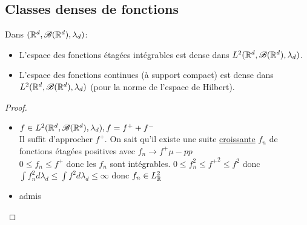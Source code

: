 \subsection{Classes denses de fonctions}

\begin{theorem}
	Dans $(\mathbb{R}^d, \mathscr{B} (\mathbb{R}^d), \lambda_d)$:

	\begin{itemize}
		\item L'espace des fonctions étagées intégrables est dense dans $L^2(\mathbb{R}^d, \mathscr{B} (\mathbb{R}^d), \lambda_d)$.
		\item L'espace des fonctions continues (à support compact) est dense dans $L^2(\mathbb{R}^d, \mathscr{B} (\mathbb{R}^d), \lambda_d)$ (pour la norme de l'espace de Hilbert).
	\end{itemize}
\end{theorem}

\begin{proof}
	\begin{itemize}
		\item $ f \in L^2(\mathbb{R}^d, \mathscr{B} (\mathbb{R}^d), \lambda_d), f = f^+ + f^-$\\
		      Il suffit d'approcher $f^+$. On sait qu'il existe une suite \underline{croissante} $f_n$ de fonctions étagées positives avec $f_n \to f^+ \mu-pp$ \\
		      $0 \leq f_n \leq f^+$ donc les $f_n$ sont intégrables.
      $0\leq f_n^2 \leq {f^+}^2 \leq f^2$ donc $\int f_n^2 d \lambda_d \leq \int f^2d \lambda_d \le \infty$ donc $f_n \in L^2_{\mathbb{R}}$
		\item admis
	\end{itemize}
\end{proof}




